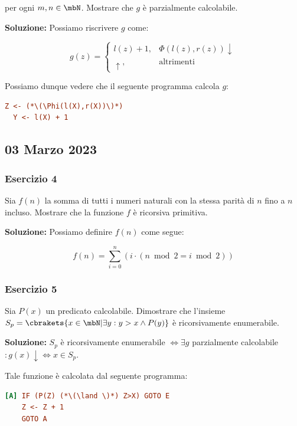 per ogni \(m,n \in \mbN\). Mostrare che \(g\) è parzialmente calcolabile.

\textbf{Soluzione: } Possiamo riscrivere \(g\) come:

\begin{equation}
  g(z)= \begin{cases}
    l(z)+1, & \Phi(l(z),r(z)) \downarrow\\
    \uparrow, & \text{altrimenti}
  \end{cases}
\end{equation}

Possiamo dunque vedere che il seguente programma calcola \(g\):

\begin{lstlisting}[language=ini, caption={ }]
  Z <- (*\(\Phi(l(X),r(X))\)*)
  Y <- l(X) + 1
\end{lstlisting}

\subsection{03 Marzo 2023}

\subsubsection{Esercizio 4}

Sia \(f(n)\) la somma di tutti i numeri naturali con la stessa parità di \(n\) fino a \(n\) incluso. Mostrare che la funzione \(f\) è ricorsiva primitiva.

\textbf{Soluzione: } Possiamo definire \(f(n)\) come segue:

\begin{equation}
  f(n) = \sum_{i=0}^{n} (i \cdot (n \bmod 2 = i \bmod 2))
\end{equation}

\subsubsection{Esercizio 5}

Sia \(P(x)\) un predicato calcolabile. Dimostrare che l'insieme \(S_p=\cbrakets{x \in \mbN \vert \exists y : y>x \land P(y)}\) è ricorsivamente enumerabile.

\textbf{Soluzione: } \(S_p\) è ricorsivamente enumerabile \(\iff \exists g\) parzialmente calcolabile \(: g(x) \downarrow \iff x \in S_p\).

Tale funzione è calcolata dal seguente programma:

\begin{lstlisting}[language=ini, caption={ }]
[A] IF (P(Z) (*\(\land \)*) Z>X) GOTO E
    Z <- Z + 1
    GOTO A
\end{lstlisting}


